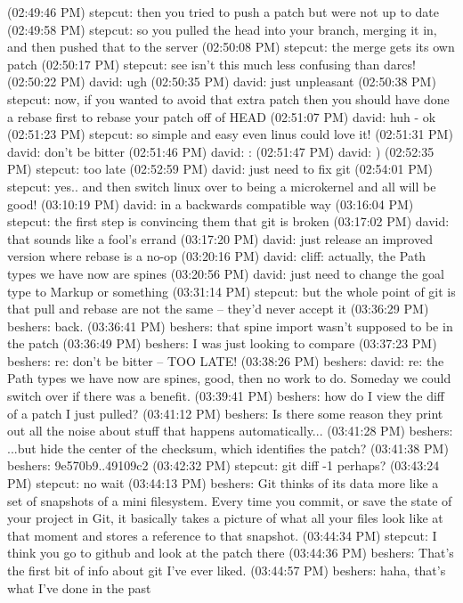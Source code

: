 (02:49:46 PM) stepcut: then you tried to push a patch but were not up to date
(02:49:58 PM) stepcut: so you pulled the head into your branch, merging it in,
and then pushed that to the server
(02:50:08 PM) stepcut: the merge gets its own patch
(02:50:17 PM) stepcut: see isn't this much less confusing than darcs!
(02:50:22 PM) david: ugh
(02:50:35 PM) david: just unpleasant
(02:50:38 PM) stepcut: now, if you wanted to avoid that extra patch then you
should have done a rebase first to rebase your patch off of HEAD
(02:51:07 PM) david: huh - ok
(02:51:23 PM) stepcut: so simple and easy even linus could love it!
(02:51:31 PM) david: don't be bitter
(02:51:46 PM) david: :
(02:51:47 PM) david: )
(02:52:35 PM) stepcut: too late
(02:52:59 PM) david: just need to fix git
(02:54:01 PM) stepcut: yes.. and then switch linux over to being a microkernel
and all will be good!
(03:10:19 PM) david: in a backwards compatible way
(03:16:04 PM) stepcut: the first step is convincing them that git is broken
(03:17:02 PM) david: that sounds like a fool's errand
(03:17:20 PM) david: just release an improved version where rebase is a no-op
(03:20:16 PM) david: cliff: actually, the Path types we have now are spines
(03:20:56 PM) david: just need to change the goal type to Markup or something
(03:31:14 PM) stepcut: but the whole point of git is that pull and rebase are
not the same -- they'd never accept it
(03:36:29 PM) beshers: back.
(03:36:41 PM) beshers: that spine import wasn't supposed to be in the patch
(03:36:49 PM) beshers: I was just looking to compare
(03:37:23 PM) beshers: re: don't be bitter -- TOO LATE!
(03:38:26 PM) beshers: david: re: the Path types we have now are spines, good,
then no work to do. Someday we could switch over if there was a benefit.
(03:39:41 PM) beshers: how do I view the diff of a patch I just pulled?
(03:41:12 PM) beshers: Is there some reason they print out all the noise about
stuff that happens automatically...
(03:41:28 PM) beshers: ...but hide the center of the checksum, which identifies
the patch?
(03:41:38 PM) beshers: 9e570b9..49109c2
(03:42:32 PM) stepcut: git diff -1 perhaps?
(03:43:24 PM) stepcut: no wait
(03:44:13 PM) beshers: Git thinks of its data more like a set of snapshots of a
mini filesystem. Every time you commit, or save the state of your project in
Git, it basically takes a picture of what all your files look like at that
moment and stores a reference to that snapshot.
(03:44:34 PM) stepcut: I think you go to github and look at the patch there
(03:44:36 PM) beshers: That's the first bit of info about git I've ever liked.
(03:44:57 PM) beshers: haha, that's what I've done in the past
